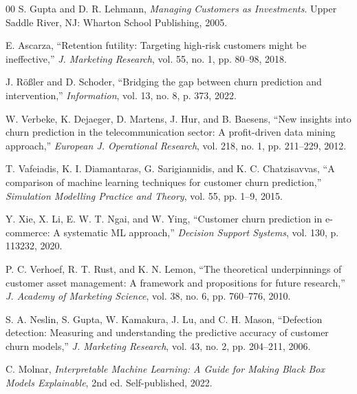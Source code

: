 \documentclass[conference]{IEEEtran}
\begin{document}
\begin{thebibliography}{00}
S. Gupta and D. R. Lehmann, \textit{Managing Customers as Investments}. Upper Saddle River, NJ: Wharton School Publishing, 2005.

E. Ascarza, ``Retention futility: Targeting high-risk customers might be ineffective,'' \textit{J. Marketing Research}, vol. 55, no. 1, pp. 80--98, 2018.

J. Rößler and D. Schoder, ``Bridging the gap between churn prediction and intervention,'' \textit{Information}, vol. 13, no. 8, p. 373, 2022.

W. Verbeke, K. Dejaeger, D. Martens, J. Hur, and B. Baesens, ``New insights into churn prediction in the telecommunication sector: A profit-driven data mining approach,'' \textit{European J. Operational Research}, vol. 218, no. 1, pp. 211--229, 2012.

T. Vafeiadis, K. I. Diamantaras, G. Sarigiannidis, and K. C. Chatzisavvas, ``A comparison of machine learning techniques for customer churn prediction,'' \textit{Simulation Modelling Practice and Theory}, vol. 55, pp. 1--9, 2015.

Y. Xie, X. Li, E. W. T. Ngai, and W. Ying, ``Customer churn prediction in e-commerce: A systematic ML approach,'' \textit{Decision Support Systems}, vol. 130, p. 113232, 2020.

P. C. Verhoef, R. T. Rust, and K. N. Lemon, ``The theoretical underpinnings of customer asset management: A framework and propositions for future research,'' \textit{J. Academy of Marketing Science}, vol. 38, no. 6, pp. 760--776, 2010.

S. A. Neslin, S. Gupta, W. Kamakura, J. Lu, and C. H. Mason, ``Defection detection: Measuring and understanding the predictive accuracy of customer churn models,'' \textit{J. Marketing Research}, vol. 43, no. 2, pp. 204--211, 2006.

C. Molnar, \textit{Interpretable Machine Learning: A Guide for Making Black Box Models Explainable}, 2nd ed. Self-published, 2022.

\end{thebibliography}
\end{document}
